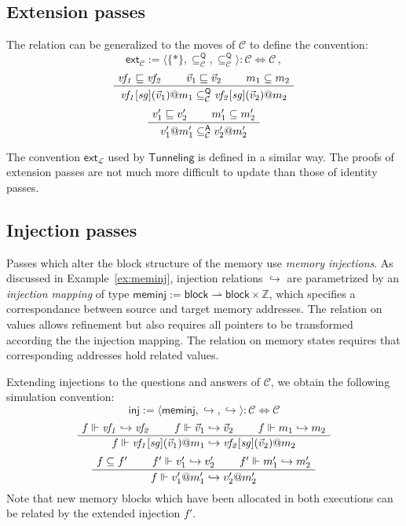 \documentclass[sigplan,10pt,review,anonymous]{acmart}
\newcommand{\kw}[1]{\ensuremath{ \mathsf{#1} }}
\begin{document}

\subsection{Extension passes} %

The relation can be generalized to the moves of $\mathcal{C}$
to define the convention:
\[
    \kw{ext}_\mathcal{C} :=
      \langle \{*\},
        {\subseteq_\mathcal{C}^\kw{Q}},
        {\subseteq_\mathcal{C}^\kw{Q}}
      \rangle
      : \mathcal{C} \Leftrightarrow \mathcal{C} \,,
\]
\[
    \AxiomC{$\mathit{vf_1} \sqsubseteq \mathit{vf_2}$}
    \AxiomC{$\vec{v}_1 \sqsubseteq \vec{v}_2$}
    \AxiomC{$m_1 \subseteq m_2$}
    \TrinaryInfC{$\mathit{vf_1}[\mathit{sg}](\vec{v}_1)@m_1
      \subseteq_\mathcal{C}^\kw{Q}
      \mathit{vf_2}[\mathit{sg}](\vec{v}_2)@m_2$}
    \DisplayProof
\]
\[
    \AxiomC{$v_1' \sqsubseteq v_2'$}
    \AxiomC{$m_1' \subseteq m_2'$}
    \BinaryInfC{$v_1'@m_1' \subseteq_\mathcal{C}^\kw{A} v_2'@m_2'$}
    \DisplayProof
\]

The convention $\kw{ext}_{\!\mathcal{L}}$
used by $\kw{Tunneling}$
is defined in a similar way.
The proofs of extension passes are not much more difficult to update
than those of identity passes.


\subsection{Injection passes} \label{sec:pass:inj} %

Passes which alter the block structure of the memory
use \emph{memory injections}.
As discussed in Example~\ref{ex:meminj},
injection relations $\hookrightarrow$
are parametrized by an \emph{injection mapping}
of type
$\kw{meminj} :=
\kw{block} \rightharpoonup \kw{block} \times \mathbb{Z}$,
which specifies a correspondance between
source and target memory addresses.
The relation on values
allows refinement but also requires
all pointers to be transformed
according the the injection mapping.
The relation on memory states
requires that corresponding addresses
hold related values.

Extending injections to the questions and answers of $\mathcal{C}$,
we obtain the following simulation convention:
\[
    \kw{inj} := \langle
      \kw{meminj},
      {\hookrightarrow},
      {\hookrightarrow}
    \rangle : \mathcal{C} \Leftrightarrow \mathcal{C}
\]
\[
    \AxiomC{$f \Vdash \mathit{vf_1} \hookrightarrow \mathit{vf_2}$}
    \AxiomC{$f \Vdash \vec{v}_1 \hookrightarrow \vec{v}_2$}
    \AxiomC{$f \Vdash m_1 \hookrightarrow m_2$}
    \TrinaryInfC{$f \Vdash
      \mathit{vf_1}[\mathit{sg}](\vec{v}_1)@m_1
      \hookrightarrow
      \mathit{vf_2}[\mathit{sg}](\vec{v}_2)@m_2$}
    \DisplayProof
\]
\[
    \AxiomC{$f \subseteq f'$}
    \AxiomC{$f' \Vdash v_1' \hookrightarrow v_2'$}
    \AxiomC{$f' \Vdash m_1' \hookrightarrow m_2'$}
    \TrinaryInfC{$f \Vdash v_1'@m_1' \hookrightarrow v_2'@m_2'$}
    \DisplayProof
\]
Note that new memory blocks
which have been allocated in both executions
can be related by the extended injection $f'$.
\end{document}
